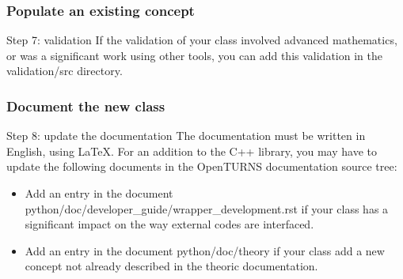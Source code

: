 \documentclass[8pt]{beamer}
\begin{document}
\begin{frame}
  \frametitle{Populate an existing concept}
  \begin{block}{Step 7: validation}
    If the validation of your class involved advanced mathematics, or was a significant work using other tools, you can add this validation in the validation/src directory.

  \end{block}
\end{frame}
\begin{frame}
  \frametitle{Document the new class}
  \begin{block}{Step 8: update the documentation}
    The documentation must be written in English, using LaTeX. For an addition to the C++ library, you may have to update the following documents in the OpenTURNS documentation source tree:
    \begin{itemize}
    \item Add an entry in the document python/doc/developer\_guide/wrapper\_development.rst if your class has a significant impact on the way external codes are interfaced.
    \item Add an entry in the document python/doc/theory if your class add a new concept not already described in the theoric documentation.
    \end{itemize}
  \end{block}
\end{frame}
\end{document}
